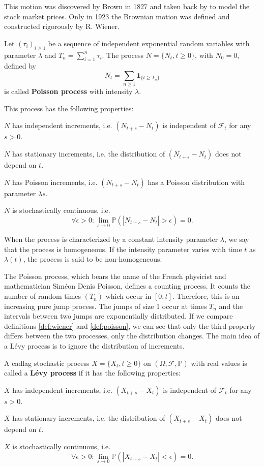 This motion was discovered by Brown in 1827 and taken back by \citeauthor{Bac00} \citeyearpar{Bac00} \cite{Bac00} to model the stock market prices. Only in 1923 the Brownian motion was defined and constructed rigorously by R. Wiener.

\begin{defn}\label{def:poisson}
Let $(\tau_i)_{i\geq 1}$ be a sequence of independent exponential random variables with parameter $\lambda$ and $T_n = \sum_{i=1}^n \tau_i$. The process $N = \{N_t,t\geq 0\}$, with $N_0=0$, defined by
$$N_t = \sum_{n\geq 1}\mathbf{1}_{\{t\geq T_n\}}$$
is called \textbf{Poisson process} with intensity $\lambda$.

This process has the following properties:
\begin{my_list_num}
\item $N$ has independent increments, i.e. $(N_{t+s}-N_t)$ is independent of $\mathcal{F}_t$ for any $s>0$. 
\item $N$ has stationary increments, i.e. the distribution of $(N_{t+s}-N_t)$ does not depend on $t$.
\item $N$ has Poisson increments, i.e. $(N_{t+s}-N_t)$ has a Poisson distribution with parameter $\lambda s$.
\item $N$ is stochastically continuous, i.e. $$\forall \epsilon>0: \lim_{s \to 0}\mathbb{P}(|N_{t+s}-N_t|>\epsilon)=0.$$
\end{my_list_num}
When the process is characterized by a constant intensity parameter $\lambda$, we say that the process is homogeneous. If the intensity parameter varies with time $t$ as $\lambda(t)$, the process is said to be non-homogeneous.
\end{defn}

The Poisson process, which bears the name of the French physicist and mathematician Sim\'eon Denis Poisson, defines a counting process. It counts the number of random times $(T_n)$ which occur in $[0,t]$. Therefore, this is an increasing pure jump process. The jumps of size 1 occur at times $T_n$ and the intervals between two jumps are exponentially distributed. If we compare definitions \ref{def:wiener} and \ref{def:poisson}, we can see that only the third property differs between the two processes, only the distribution changes. The main idea of a L\'evy process is to ignore the distribution of increments.

\begin{defn}
A cadlag stochastic process $X =\{X_t,t\geq 0\}$ on $(\Omega,\mathcal{F},\mathbb{P})$ with real values is called a \textbf{L\'evy process} if it has the following properties:
\begin{my_list_num}
\item $X$ has independent increments, i.e. $(X_{t+s}-X_t)$ is independent of $\mathcal{F}_t$ for any $s>0$. 
\item $X$ has stationary increments, i.e. the distribution of $(X_{t+s}-X_t)$ does not depend on $t$. 
\item $X$ is stochastically continuous, i.e. $$\forall \epsilon>0: \lim_{s \to 0}\mathbb{P}(|X_{t+s}-X_t|<\epsilon)=0.$$
\end{my_list_num}
\end{defn}

